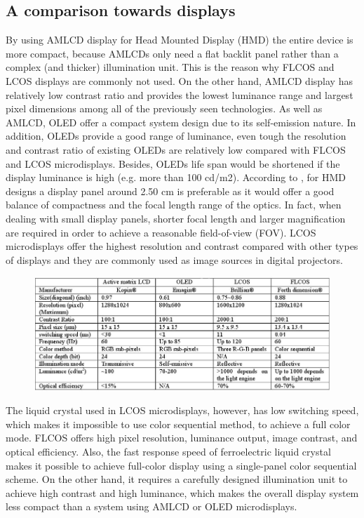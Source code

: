 \subsection{A comparison towards displays}
By using AMLCD display for Head Mounted Display (HMD) the entire 
device is more compact, because AMLCDs only need a flat backlit 
panel rather than a complex (and thicker) illumination unit. 
This is the reason why FLCOS and LCOS displays are commonly not used. 
%
On the other hand, AMLCD display has relatively low contrast ratio 
and provides the lowest luminance range and largest pixel dimensions 
among all of the previously seen technologies.
As well as AMLCD, OLED offer a compact system design due to its 
self-emission nature. In addition, OLEDs provide a good range of 
luminance, even tough the resolution and contrast ratio of 
existing OLEDs are relatively low compared with FLCOS and LCOS microdisplays.
%
Besides, OLEDs life span would be shortened if the display 
luminance is high (e.g. more than 100 cd/m2).
%
According to \cite{Zhang:08}, for HMD designs a display panel around 2.50 cm is 
preferable as it would offer a good balance of compactness and the 
focal length range of the optics. In fact, when dealing with small 
display panels, shorter focal length and larger magnification are 
required in order to achieve a reasonable field-of-view (FOV). 
%
LCOS microdisplays offer the highest resolution and contrast compared 
with other types of displays and they are commonly used as image 
sources in digital projectors. 
%

%
\begin{figure}[!h]
  \begin{center}
    \includegraphics[width=400pt]{img/hmd_comparison_table.jpg}  %
  \end{center}
\end{figure}
%

%
The liquid crystal used in LCOS microdisplays, however, has low 
switching speed, which makes it impossible to use color sequential 
method, to achieve a full color mode. FLCOS offers high pixel 
resolution, luminance output, image contrast, and optical efficiency. 
Also, the fast response speed of ferroelectric liquid crystal makes 
it possible to achieve full-color display using a single-panel color 
sequential scheme. On the other hand, it requires a carefully designed 
illumination unit to achieve high contrast and high luminance, which 
makes the overall display system less compact than a system using 
AMLCD or OLED microdisplays.
